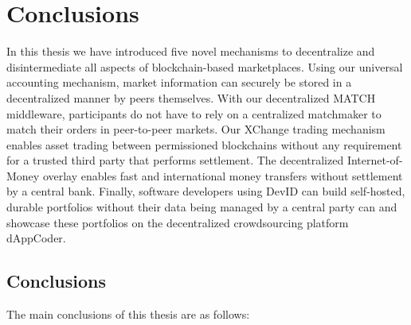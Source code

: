 \chapter{Conclusions}
\label{conclusion}

In this thesis we have introduced five novel mechanisms to decentralize and disintermediate all aspects of blockchain-based marketplaces.
Using our universal \TrustChain{} accounting mechanism, market information can securely be stored in a decentralized manner by peers themselves.
With our decentralized MATCH middleware, participants do not have to rely on a centralized matchmaker to match their orders in peer-to-peer markets.
Our XChange trading mechanism enables asset trading between permissioned blockchains without any requirement for a trusted third party that performs settlement.
The decentralized Internet-of-Money overlay enables fast and international money transfers without settlement by a central bank.
Finally, software developers using DevID can build self-hosted, durable portfolios without their data being managed by a central party can and showcase these portfolios on the decentralized crowdsourcing platform dAppCoder.

\section{Conclusions}
The main conclusions of this thesis are as follows:

